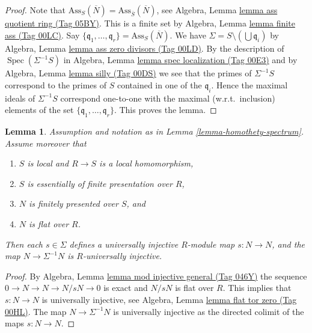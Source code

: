 \documentclass{amsart}
\theoremstyle{plain}
\newtheorem{lemma}[subsection]{Lemma}
\theoremstyle{definition}
\theoremstyle{remark}
\numberwithin{equation}{subsection}
\def\Spec{\mathop{\mathrm{Spec}}}
\begin{document}
\begin{proof}
Note that
$\text{Ass}_S(\overline{N}) = \text{Ass}_{\overline{S}}(\overline{N})$, see
Algebra, Lemma \href{https://stacks.math.columbia.edu/tag/05BY}{lemma ass quotient ring (Tag 05BY)}.
This is a finite set by
Algebra, Lemma \href{https://stacks.math.columbia.edu/tag/00LC}{lemma finite ass (Tag 00LC)}.
Say $\{\mathfrak q_1, \ldots, \mathfrak q_r\} = \text{Ass}_S(\overline{N})$.
We have $\Sigma = S \setminus (\bigcup \mathfrak q_i)$ by
Algebra, Lemma \href{https://stacks.math.columbia.edu/tag/00LD}{lemma ass zero divisors (Tag 00LD)}.
By the description of $\Spec(\Sigma^{-1}S)$ in
Algebra, Lemma \href{https://stacks.math.columbia.edu/tag/00E3}{lemma spec localization (Tag 00E3)}
and by
Algebra, Lemma \href{https://stacks.math.columbia.edu/tag/00DS}{lemma silly (Tag 00DS)}
we see that the primes of $\Sigma^{-1}S$ correspond to the primes of
$S$ contained in one of the $\mathfrak q_i$.
Hence the maximal ideals of $\Sigma^{-1}S$ correspond one-to-one with the
maximal (w.r.t.\ inclusion) elements of the set
$\{\mathfrak q_1, \ldots, \mathfrak q_r\}$. This proves the lemma.
\end{proof}


\begin{lemma}
\label{lemma-homothety-universally-injective}
Assumption and notation as in
Lemma \ref{lemma-homothety-spectrum}.
Assume moreover that
\begin{enumerate}
\item $S$ is local and $R \to S$ is a local homomorphism,
\item $S$ is essentially of finite presentation over $R$,
\item $N$ is finitely presented over $S$, and
\item $N$ is flat over $R$.
\end{enumerate}
Then each $s \in \Sigma$ defines a
universally injective $R$-module map $s : N \to N$, and the
map $N \to \Sigma^{-1}N$ is $R$-universally injective.
\end{lemma}

\begin{proof}
By
Algebra, Lemma \href{https://stacks.math.columbia.edu/tag/046Y}{lemma mod injective general (Tag 046Y)}
the sequence $0 \to N \to N \to N/sN \to 0$ is exact and
$N/sN$ is flat over $R$. This implies that $s : N \to N$
is universally injective, see
Algebra, Lemma \href{https://stacks.math.columbia.edu/tag/00HL}{lemma flat tor zero (Tag 00HL)}.
The map $N \to \Sigma^{-1}N$ is universally injective as the directed
colimit of the maps $s : N \to N$.
\end{proof}
\end{document}
